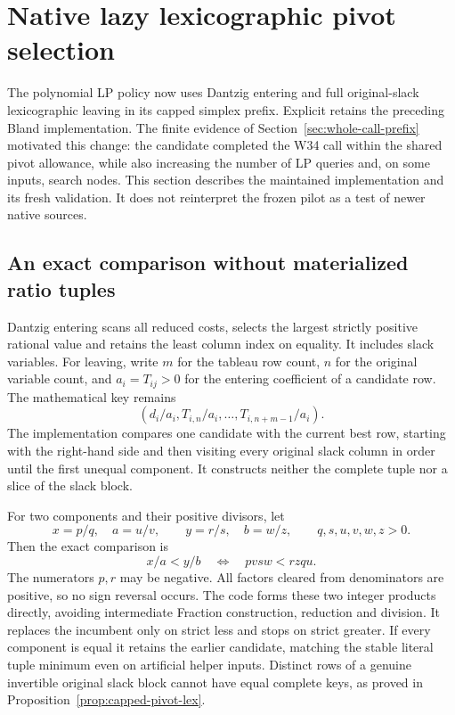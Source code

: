 \section{Native lazy lexicographic pivot selection}
\label{sec:native-lex-prefix}

The polynomial LP policy now uses Dantzig entering and full original-slack
lexicographic leaving in its capped simplex prefix.  Explicit
 retains the preceding Bland implementation.  The
finite evidence of Section~\ref{sec:whole-call-prefix} motivated this change:
the candidate completed the W34 call within the shared pivot allowance,
while also increasing the number of LP queries and, on some inputs, search
nodes.  This section describes the maintained implementation and its fresh
validation.  It does not reinterpret the frozen pilot as a test of newer
native sources.

\subsection{An exact comparison without materialized ratio tuples}

Dantzig entering scans all reduced costs, selects the largest strictly
positive rational value and retains the least column index on equality.
It includes slack variables.  For leaving, write $m$ for the tableau row
count, $n$ for the original variable count, and $a_i=T_{ij}>0$ for the
entering coefficient of a candidate row.  The mathematical key remains
\[
 \left(d_i/a_i,T_{i,n}/a_i,\ldots,T_{i,n+m-1}/a_i\right).
\]
The implementation compares one candidate with the current best row, starting
with the right-hand side and then visiting every original slack column in
order until the first unequal component.  It constructs neither the complete
tuple nor a slice of the slack block.

For two components and their positive divisors, let
\[
 x=p/q,\quad a=u/v,\qquad y=r/s,\quad b=w/z,
 \qquad q,s,u,v,w,z>0.
\]
Then the exact comparison is
\[
            x/a<y/b \quad\Longleftrightarrow\quad
            pvsw<rzqu.
\]
The numerators $p,r$ may be negative.  All factors cleared from denominators
are positive, so no sign reversal occurs.  The code forms these two integer
products directly, avoiding intermediate Fraction construction, reduction
and division.  It replaces the incumbent only on strict less and stops on
strict greater.  If every component is equal it retains the earlier candidate,
matching the stable literal tuple minimum even on artificial helper inputs.
Distinct rows of a genuine invertible original slack block cannot have equal
complete keys, as proved in Proposition~\ref{prop:capped-pivot-lex}.

